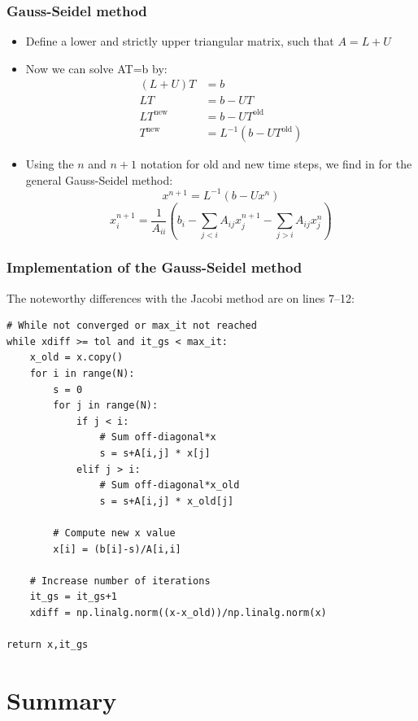 \begin{frame}[fragile]
  \frametitle{Gauss-Seidel method}
  \begin{itemize}
    \item Define a lower and strictly upper triangular matrix, such that $A = L + U$
    \item Now we can solve AT=b by:
    \begin{align*}
      (L+U)T &= b \\
      LT &= b - UT \\
      LT^\text{new} &= b - UT^\text{old} \\
      T^\text{new} &= L^{-1}(b-UT^\text{old})
   \end{align*}
     \item Using the $n$ and $n+1$ notation for old and new time steps, we find in for the general Gauss-Seidel method:
     \[
      x^{n+1} = L^{-1}\left(b-Ux^n\right)
     \]
     \[
      x_i^{n+1} = \frac{1}{A_{ii}}\left(b_i - \sum_{j<i} A_{ij}x_j^{n+1}- \sum_{j>i} A_{ij}x_j^n\right)
     \]
  \end{itemize}
\end{frame}

\begin{frame}[fragile]
  \frametitle{Implementation of the Gauss-Seidel method}
  The noteworthy differences with the Jacobi method are on lines 7--12:
  \begin{lstlisting}[basicstyle=\scriptsize\ttfamily]
# While not converged or max_it not reached
while xdiff >= tol and it_gs < max_it:
    x_old = x.copy()
    for i in range(N):
        s = 0
        for j in range(N):
            if j < i:
                # Sum off-diagonal*x
                s = s+A[i,j] * x[j]
            elif j > i:
                # Sum off-diagonal*x_old
                s = s+A[i,j] * x_old[j]

        # Compute new x value
        x[i] = (b[i]-s)/A[i,i]

    # Increase number of iterations
    it_gs = it_gs+1
    xdiff = np.linalg.norm((x-x_old))/np.linalg.norm(x)

return x,it_gs
\end{lstlisting}
\end{frame}

\section{Summary}
